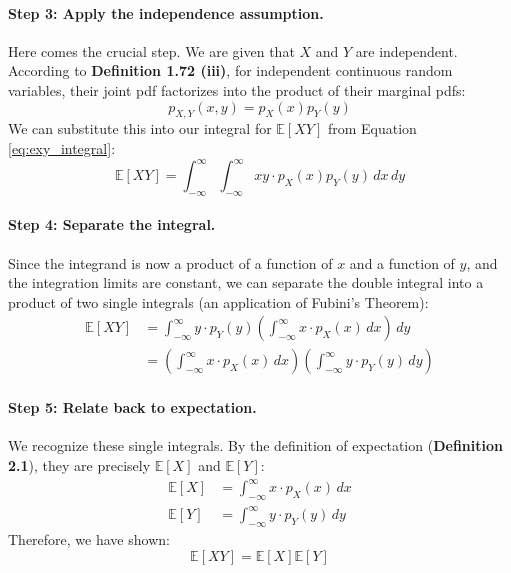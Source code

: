 \documentclass[11pt,a4paper]{article}
\begin{document}
\paragraph{Step 3: Apply the independence assumption.}
Here comes the crucial step. We are given that $X$ and $Y$ are independent. According to \textbf{Definition 1.72 (iii)}, for independent continuous random variables, their joint pdf factorizes into the product of their marginal pdfs:
\begin{equation*}
    p_{X,Y}(x,y) = p_X(x) p_Y(y)
\end{equation*}
We can substitute this into our integral for $\mathbb{E}[XY]$ from Equation \ref{eq:exy_integral}:
\begin{equation*}
    \mathbb{E}[XY] = \int_{-\infty}^{\infty} \int_{-\infty}^{\infty} xy \cdot p_X(x) p_Y(y) \,dx\,dy
\end{equation*}

\paragraph{Step 4: Separate the integral.}
Since the integrand is now a product of a function of $x$ and a function of $y$, and the integration limits are constant, we can separate the double integral into a product of two single integrals (an application of Fubini's Theorem):
\begin{align*}
    \mathbb{E}[XY] &= \int_{-\infty}^{\infty} y \cdot p_Y(y) \left( \int_{-\infty}^{\infty} x \cdot p_X(x) \,dx \right) \,dy \\
    &= \left( \int_{-\infty}^{\infty} x \cdot p_X(x) \,dx \right) \left( \int_{-\infty}^{\infty} y \cdot p_Y(y) \,dy \right)
\end{align*}

\paragraph{Step 5: Relate back to expectation.}
We recognize these single integrals. By the definition of expectation (\textbf{Definition 2.1}), they are precisely $\mathbb{E}[X]$ and $\mathbb{E}[Y]$:
\begin{align*}
    \mathbb{E}[X] &= \int_{-\infty}^{\infty} x \cdot p_X(x) \,dx \\
    \mathbb{E}[Y] &= \int_{-\infty}^{\infty} y \cdot p_Y(y) \,dy
\end{align*}
Therefore, we have shown:
\begin{equation}
    \mathbb{E}[XY] = \mathbb{E}[X]\mathbb{E}[Y]
    \label{eq:exy_factor}
\end{equation}
\end{document}
